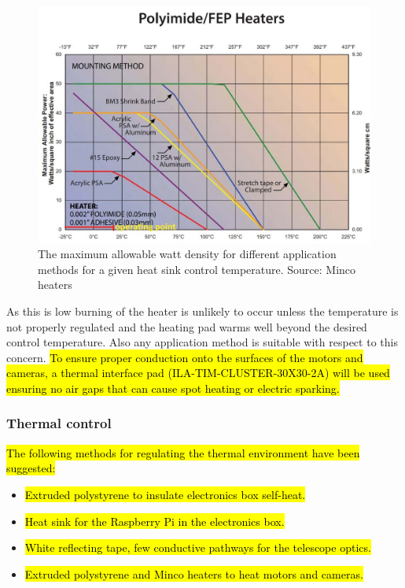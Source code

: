 	\begin{figure}[H]
    \centering
    \includegraphics[scale=0.8]{4-experiment-design/img/mechanical/wattdensity.JPG}
	\caption{The maximum allowable watt density for different application methods for a given heat sink control temperature. Source: Minco heaters}
	\label{fig:wattdensity}
	\end{figure}

As this is low burning of the heater is unlikely to occur unless the temperature is not properly regulated and the heating pad warms well beyond the desired control temperature. Also any application method is suitable with respect to this concern. \hl{To ensure proper conduction onto the surfaces of the motors and cameras, a thermal interface pad (ILA-TIM-CLUSTER-30X30-2A) will be used ensuring no air gaps that can cause spot heating or electric sparking.} \\














\subsubsection{Thermal control}
\hl{The following methods for regulating the thermal environment have been suggested:}

\begin{itemize}
  \item \hl{Extruded polystyrene to insulate electronics box self-heat.} 
  \item \hl{Heat sink for the Raspberry Pi in the electronics box.}
  \item \hl{White reflecting tape, few conductive pathways for the telescope optics.}
  \item \hl{Extruded polystyrene and Minco heaters to heat motors and cameras.}

\end{itemize}

